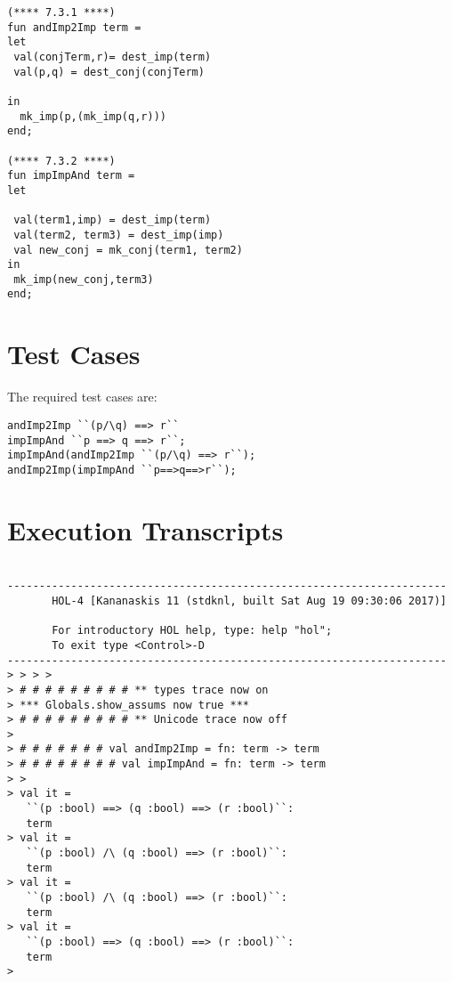 \documentclass{report}
\begin{document}
\lstset{frameround=tttt}
\begin{lstlisting}[frame=tRBL]
(**** 7.3.1 ****)
fun andImp2Imp term =
let
 val(conjTerm,r)= dest_imp(term)
 val(p,q) = dest_conj(conjTerm)
 
in
  mk_imp(p,(mk_imp(q,r)))
end;

(**** 7.3.2 ****)
fun impImpAnd term =
let

 val(term1,imp) = dest_imp(term)
 val(term2, term3) = dest_imp(imp)
 val new_conj = mk_conj(term1, term2)
in
 mk_imp(new_conj,term3)
end;
\end{lstlisting}

\section{Test Cases}
\label{sec:test-cases-2}

The required test cases are:
\begin{lstlisting}[frame = tRBL ]
andImp2Imp ``(p/\q) ==> r``
impImpAnd ``p ==> q ==> r``;
impImpAnd(andImp2Imp ``(p/\q) ==> r``);
andImp2Imp(impImpAnd ``p==>q==>r``);
\end{lstlisting}


\section{Execution Transcripts}
\label{sec:exec-transcr-2}

\setcounter{sessioncount}{0}
\begin{session}
  \begin{scriptsize}
\begin{verbatim}

---------------------------------------------------------------------
       HOL-4 [Kananaskis 11 (stdknl, built Sat Aug 19 09:30:06 2017)]

       For introductory HOL help, type: help "hol";
       To exit type <Control>-D
---------------------------------------------------------------------
> > > > 
> # # # # # # # # # ** types trace now on
> *** Globals.show_assums now true ***
> # # # # # # # # # ** Unicode trace now off
> 
> # # # # # # # val andImp2Imp = fn: term -> term
> # # # # # # # # val impImpAnd = fn: term -> term
> > 
> val it =
   ``(p :bool) ==> (q :bool) ==> (r :bool)``:
   term
> val it =
   ``(p :bool) /\ (q :bool) ==> (r :bool)``:
   term
> val it =
   ``(p :bool) /\ (q :bool) ==> (r :bool)``:
   term
> val it =
   ``(p :bool) ==> (q :bool) ==> (r :bool)``:
   term
> 
\end{verbatim}
  \end{scriptsize}
\end{session}
\end{document}
